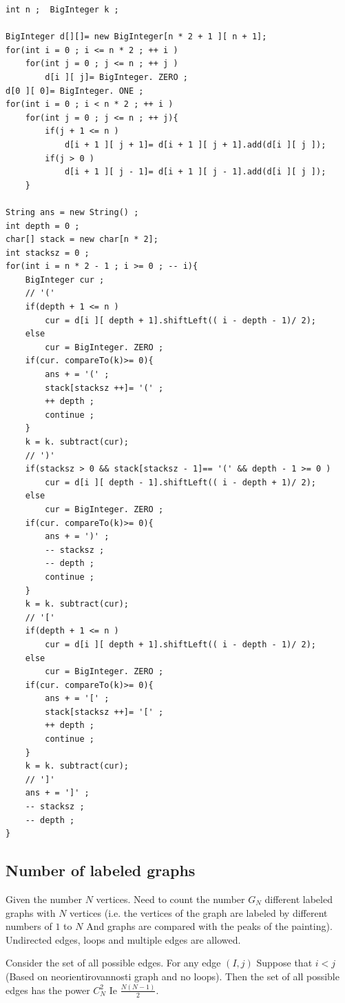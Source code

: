 \begin{verbatim}
int n ;  BigInteger k ;  
 
BigInteger d[][]= new BigInteger[n * 2 + 1 ][ n + 1];
for(int i = 0 ; i <= n * 2 ; ++ i )
    for(int j = 0 ; j <= n ; ++ j )
        d[i ][ j]= BigInteger. ZERO ;
d[0 ][ 0]= BigInteger. ONE ;
for(int i = 0 ; i < n * 2 ; ++ i )
    for(int j = 0 ; j <= n ; ++ j){
        if(j + 1 <= n )
            d[i + 1 ][ j + 1]= d[i + 1 ][ j + 1].add(d[i ][ j ]);
        if(j > 0 )
            d[i + 1 ][ j - 1]= d[i + 1 ][ j - 1].add(d[i ][ j ]);
    }
 
String ans = new String() ;
int depth = 0 ;
char[] stack = new char[n * 2];
int stacksz = 0 ;
for(int i = n * 2 - 1 ; i >= 0 ; -- i){
    BigInteger cur ;
    // '('
    if(depth + 1 <= n )
        cur = d[i ][ depth + 1].shiftLeft(( i - depth - 1)/ 2);
    else
        cur = BigInteger. ZERO ;
    if(cur. compareTo(k)>= 0){
        ans + = '(' ;
        stack[stacksz ++]= '(' ;
        ++ depth ;
        continue ;
    }
    k = k. subtract(cur);
    // ')'
    if(stacksz > 0 && stack[stacksz - 1]== '(' && depth - 1 >= 0 )
        cur = d[i ][ depth - 1].shiftLeft(( i - depth + 1)/ 2);
    else
        cur = BigInteger. ZERO ;
    if(cur. compareTo(k)>= 0){
        ans + = ')' ;
        -- stacksz ;
        -- depth ;
        continue ;
    }
    k = k. subtract(cur);
    // '['
    if(depth + 1 <= n )
        cur = d[i ][ depth + 1].shiftLeft(( i - depth - 1)/ 2);
    else
        cur = BigInteger. ZERO ;
    if(cur. compareTo(k)>= 0){
        ans + = '[' ;
        stack[stacksz ++]= '[' ;
        ++ depth ;
        continue ;
    }
    k = k. subtract(cur);
    // ']'
    ans + = ']' ;
    -- stacksz ;
    -- depth ;
} 
\end{verbatim}

\subsection{ Number of labeled graphs }
Given the number $N$ vertices. Need to count the number $G_N$ different labeled graphs with $N$ vertices (i.e. the vertices of the graph are labeled by different numbers of $1$ to $N$ And graphs are compared with the peaks of the painting). Undirected edges, loops and multiple edges are allowed.

Consider the set of all possible edges. For any edge $(I, j)$ Suppose that $i <j$ (Based on neorientirovannosti graph and no loops). Then the set of all possible edges has the power $C_N ^ 2$ Ie $\frac {N (N-1)} {2}$.

